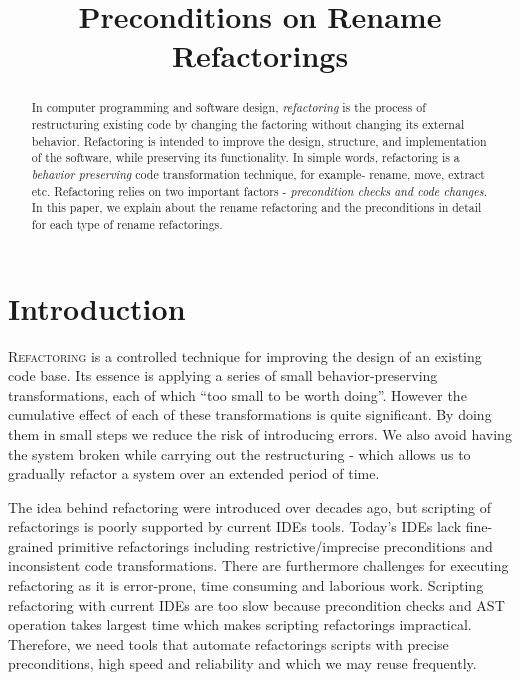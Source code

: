 \documentclass[10pt,conference]{IEEEtran}
\begin{document}
\title{Preconditions on Rename Refactorings}

\author{
\and
{}
\and
{}
}

\maketitle

\begin{abstract}
In computer programming and software design, \emph{refactoring} is the process of restructuring existing code by changing the factoring without changing its external behavior. Refactoring is intended to improve the design, structure, and implementation of the software, while preserving its functionality. In simple words, refactoring is a \emph{behavior preserving} code transformation technique, for example- rename, move, extract etc. Refactoring relies on two important factors - \emph{precondition checks and code changes}. In this paper, we explain about the rename refactoring and the preconditions in detail for each type of rename refactorings.
\end{abstract}

\section{\textbf{Introduction}}
\lettrine{R}{efactoring} is a controlled technique for improving the design of an existing code base. Its essence is applying a series of small behavior-preserving transformations, each of which ``too small to be worth doing''. However the cumulative effect of each of these transformations is quite significant. By doing them in small steps we reduce the risk of introducing errors. We also avoid having the system broken while carrying out the restructuring - which allows us to gradually refactor a system over an extended period of time.~\cite{Fowler}

The idea behind refactoring were introduced over decades ago, but scripting of refactorings is poorly supported by current IDEs tools. Today’s IDEs lack fine-grained primitive refactorings including restrictive/imprecise preconditions and inconsistent code transformations. There are furthermore challenges for executing refactoring as it is error-prone, time consuming and laborious work. Scripting refactoring with current IDEs are too slow because precondition checks and AST operation takes largest time which makes scripting refactorings impractical. Therefore, we need tools that automate refactorings scripts with precise preconditions, high speed and reliability and which we may reuse frequently. 
\end{document}
